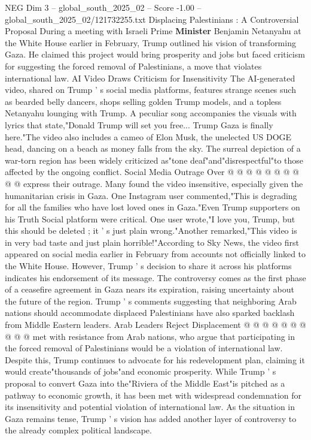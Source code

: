 \begin{textsample}{NEG Dim 3 – global\_south\_2025\_02 – Score -1.00 – global\_south\_2025\_02/121732255.txt}  \label{ex:f3_neg_004}
Displacing Palestinians : A Controversial Proposal During a meeting with Israeli Prime \textbf{Minister} Benjamin Netanyahu at the White House earlier in February, Trump outlined his vision of transforming Gaza.
He claimed this project would bring prosperity and jobs but faced criticism for suggesting the forced removal of Palestinians, a move that violates international law.
AI Video Draws Criticism for Insensitivity The AI-generated video, shared on Trump ' s social media platforms, features strange scenes such as bearded belly dancers, shops selling golden Trump models, and a topless Netanyahu lounging with Trump.
A peculiar song accompanies the visuals with lyrics that state,"Donald Trump will set you free...
Trump Gaza is finally here."The video also includes a cameo of Elon Musk, the unelected US DOGE head, dancing on a beach as money falls from the sky.
The surreal depiction of a war-torn region has been widely criticized as"tone deaf"and"disrespectful"to those affected by the ongoing conflict.
Social Media Outrage Over @ @ @ @ @ @ @ @ @ @ express their outrage.
Many found the video insensitive, especially given the humanitarian crisis in Gaza.
One Instagram user commented,"This is degrading for all the families who have lost loved ones in Gaza."Even Trump supporters on his Truth Social platform were critical.
One user wrote,"I love you, Trump, but this should be deleted ; it ' s just plain wrong."Another remarked,"This video is in very bad taste and just plain horrible!"According to Sky News, the video first appeared on social media earlier in February from accounts not officially linked to the White House.
However, Trump ' s decision to share it across his platforms indicates his endorsement of its message.
The controversy comes as the first phase of a ceasefire agreement in Gaza nears its expiration, raising uncertainty about the future of the region.
Trump ' s comments suggesting that neighboring Arab nations should accommodate displaced Palestinians have also sparked backlash from Middle Eastern leaders.
Arab Leaders Reject Displacement @ @ @ @ @ @ @ @ @ @ met with resistance from Arab nations, who argue that participating in the forced removal of Palestinians would be a violation of international law.
Despite this, Trump continues to advocate for his redevelopment plan, claiming it would create"thousands of jobs"and economic prosperity.
While Trump ' s proposal to convert Gaza into the"Riviera of the Middle East"is pitched as a pathway to economic growth, it has been met with widespread condemnation for its insensitivity and potential violation of international law.
As the situation in Gaza remains tense, Trump ' s vision has added another layer of controversy to the already complex political landscape.

\end{textsample}
